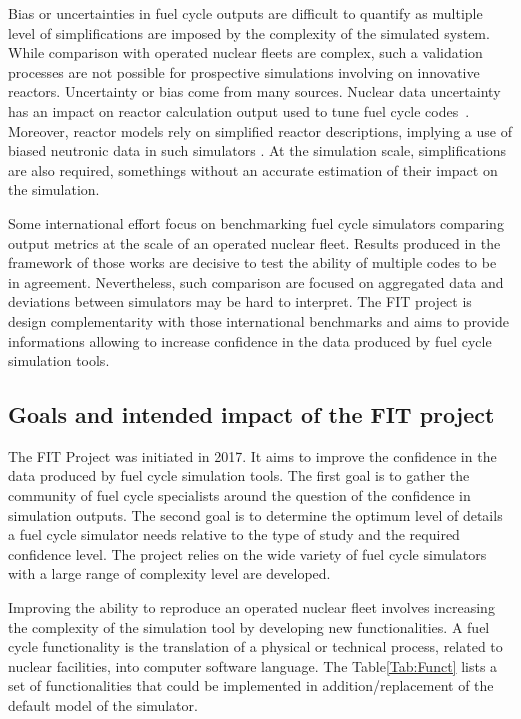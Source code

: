 Bias or uncertainties in fuel cycle outputs are difficult to quantify as
multiple level of simplifications are imposed by the complexity of the simulated
system. While comparison with operated nuclear fleets are complex, such a
validation processes are not possible for prospective simulations involving on
innovative reactors. Uncertainty or bias come from many sources. Nuclear data
uncertainty has an impact on reactor calculation output used to tune fuel cycle
codes~\cite{Krivtchik_2014}. Moreover, reactor models rely on simplified reactor
descriptions, implying a use of biased neutronic data in such simulators
\cite{Somaini_2017}.  At the simulation scale, simplifications are also
required, somethings without an accurate estimation of their impact on the
simulation. 

Some international effort \cite{NEA2016} focus on benchmarking fuel cycle
simulators comparing output metrics at the scale of an operated nuclear fleet.
Results produced in the framework of those works are decisive to test the
ability of multiple codes to be in agreement. Nevertheless, such comparison are
focused on aggregated data and deviations between simulators may be hard to
interpret. The FIT project is design complementarity with those international
benchmarks and aims to provide informations allowing to increase confidence in
the data produced by fuel cycle simulation tools.

\subsection{Goals and intended impact of the FIT project}

The FIT Project was initiated in 2017. It aims to improve the confidence in the
data produced by fuel cycle simulation tools. The first goal is to gather the
community of fuel cycle specialists around the question of the confidence in
simulation outputs. The second goal is to determine the optimum level of details
a fuel cycle simulator needs relative to the type of study and the required
confidence level. The project relies on the wide variety of fuel cycle
simulators with a large range of complexity level are developed.

Improving the ability to reproduce an operated nuclear fleet involves increasing
the complexity of the simulation tool by developing new functionalities. A fuel
cycle functionality is the translation of a physical or technical process,
related to nuclear facilities, into computer software language. The
Table\ref{Tab:Funct} lists a set of functionalities that could be implemented
in addition/replacement of the default model of the simulator.

